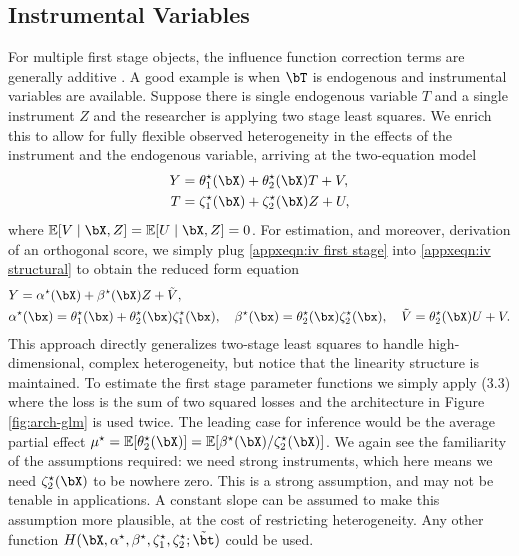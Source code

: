 \documentclass[12pt]{article}
\numberwithin{equation}{section}
\theoremstyle{definition}
\newcommand{\E}{\mathbb{E}}
\newcommand{\mtrue}{\mu^\star}
\newcommand{\ttrue}{\theta^\star}
\newcommand{\atrue}{\alpha^\star}
\newcommand{\btrue}{\beta^\star}
\newcommand{\ztrue}{\zeta^\star}
\newcommand{\btstar}{\tilde{\bt}}
\begin{document}
\begin{appendices}
\subsection{Instrumental Variables}


For multiple first stage objects, the influence function correction terms are generally additive \citep{Newey1994_Ecma}. A good example is when $\bT$ is endogenous and instrumental variables are available. Suppose there is single endogenous variable $T$ and a single instrument $Z$ and the researcher is applying two stage least squares. We enrich this to allow for fully flexible observed heterogeneity in the effects of the instrument and the endogenous variable, arriving at the two-equation model 
\begin{align}
    Y & = \ttrue_1(\bX) + \ttrue_2(\bX)T  + V,           \label{appxeqn:iv structural}\\
    T & = \ztrue_1(\bX) + \ztrue_2(\bX)Z  + U,           \label{appxeqn:iv first stage}
\end{align}
where $\E[V \mid \bX, Z] = \E[U \mid \bX, Z] = 0$. For estimation, and moreover, derivation of an orthogonal score, we simply plug \eqref{appxeqn:iv first stage} into \eqref{appxeqn:iv structural} to obtain the reduced form equation
\begin{align}
    \begin{split}
        \label{appxeqn:iv reduced form}
        & Y  = \atrue(\bX) + \btrue(\bX)Z  + \tilde{V},        \\
        & \atrue(\bx) = \ttrue_1(\bx) + \ttrue_2(\bx) \ztrue_1(\bx),    \quad    \btrue(\bx) = \ttrue_2(\bx) \ztrue_2(\bx),    \quad     \tilde{V} = \ttrue_2(\bX)U + V.
    \end{split}
\end{align}
This approach directly generalizes two-stage least squares to handle high-dimensional, complex heterogeneity, but notice that the linearity structure is maintained. To estimate the first stage parameter functions we simply apply (3.3) where the loss is the sum of two squared losses and the architecture in Figure \ref{fig:arch-glm} is used twice. The leading case for inference would be the average partial effect $\mtrue = \E[\ttrue_2(\bX)] = \E[\btrue(\bX)/\ztrue_2(\bX)]$. We again see the familiarity of the assumptions required: we need strong instruments, which here means we need $\ztrue_2(\bX)$ to be nowhere zero. This is a strong assumption, and may not be tenable in applications. A constant slope can be assumed to make this assumption more plausible, at the cost of restricting heterogeneity. Any other function $H(\bX, \atrue, \btrue, \ztrue_1, \ztrue_2; \btstar)$ could be used. 


\end{appendices}
\end{document}
